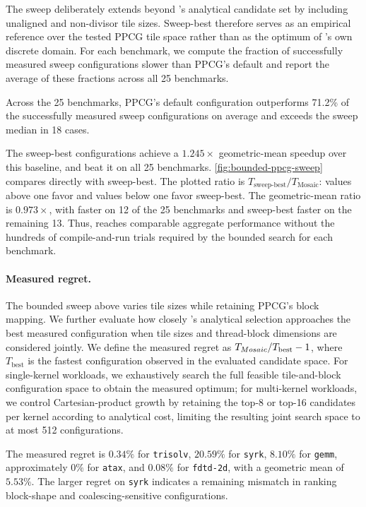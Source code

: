 The sweep deliberately extends beyond \name's analytical candidate set by including unaligned and non-divisor tile sizes. Sweep-best therefore serves as an empirical reference over the tested PPCG tile space rather than as the optimum of \name's own discrete domain. For each benchmark, we compute the fraction of successfully measured sweep configurations slower than PPCG's default and report the average of these fractions across all 25 benchmarks.

Across the 25 benchmarks, PPCG's default configuration outperforms 71.2\% of the successfully measured sweep configurations on average and exceeds the sweep median in 18 cases.

The sweep-best configurations achieve a $1.245\times$ geometric-mean speedup over this baseline, and beat it on all 25 benchmarks. \autoref{fig:bounded-ppcg-sweep} compares \name directly with sweep-best. The plotted ratio is \(T_{\mathrm{sweep\text{-}best}} / T_{\mathrm{Mosaic}}\): values above one favor \name and values below one favor sweep-best. The geometric-mean ratio is $0.973\times$, with \name faster on 12 of the 25 benchmarks and sweep-best faster on the remaining 13. Thus, \name reaches comparable aggregate performance without the hundreds of compile-and-run trials required by the bounded search for each benchmark.

\paragraph{Measured regret.}
The bounded sweep above varies tile sizes while retaining PPCG's block
mapping. We further evaluate how closely \name's analytical selection
approaches the best measured configuration when tile sizes and thread-block
dimensions are considered jointly. We define the measured regret as
\(T_{{Mosaic}}/T_{\mathrm{best}}-1\), where \(T_{\mathrm{best}}\) is the fastest
configuration observed in the evaluated candidate space. For single-kernel
workloads, we exhaustively search the full feasible tile-and-block
configuration space to obtain the measured optimum; for multi-kernel
workloads, we control Cartesian-product growth by retaining the top-8 or
top-16 candidates per kernel according to analytical cost, limiting the
resulting joint search space to at most 512 configurations.

The measured regret is \(0.34\%\) for \texttt{trisolv}, \(20.59\%\) for
\texttt{syrk}, \(8.10\%\) for \texttt{gemm}, approximately \(0\%\) for
\texttt{atax}, and \(0.08\%\) for \texttt{fdtd-2d}, with a geometric mean
of \(5.53\%\). The larger regret on \texttt{syrk} indicates
a remaining mismatch in ranking block-shape and coalescing-sensitive
configurations.

